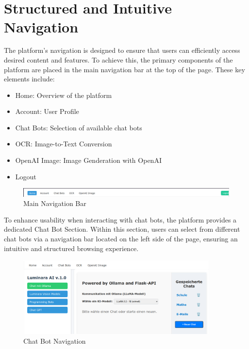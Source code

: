 \section{Structured and Intuitive Navigation}

The platform's navigation is designed to ensure that users can efficiently access desired content and features. To achieve this, the primary components of the platform are placed in the main navigation bar at the top of the page. These key elements include:

\begin{itemize}
    \item Home: Overview of the platform
    \item Account: User Profile
    \item Chat Bots: Selection of available chat bots
    \item OCR: Image-to-Text Conversion
    \item OpenAI Image: Image Genderation with OpenAI
    \item Logout
\end{itemize}

\begin{figure}[H]
    \centering
    \includegraphics[width=1\textwidth]{figures/Navigation-Bar-top.png}
    \caption{Main Navigation Bar}
    \label{fig:main_navigation_bar}
\end{figure}

To enhance usability when interacting with chat bots, the platform provides a dedicated Chat Bot Section. Within this section, users can select from different chat bots via a navigation bar located on the left side of the page, ensuring an intuitive and structured browsing experience.

\begin{figure}[H]
    \centering
    \includegraphics[width=0.9\textwidth]{figures/Chat-Bot-Navigation-Bar.png}
    \caption{Chat Bot Navigation}
    \label{fig:chat_bot_navigation}
\end{figure}

